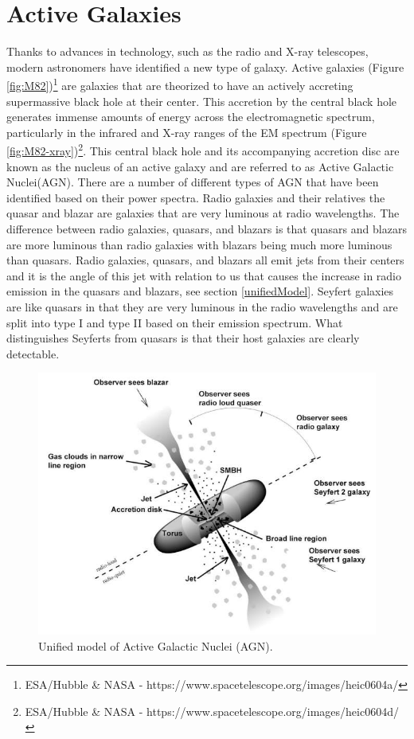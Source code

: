 \documentclass[12pt, oneside]{smuthesis}
\begin{document}
\section{\sc Active Galaxies} \label{activeGalaxies}

Thanks to advances in technology, such as the radio and X-ray telescopes, modern astronomers have identified a new type of galaxy. Active galaxies (Figure \ref{fig:M82})\footnote{ESA/Hubble \& NASA - https://www.spacetelescope.org/images/heic0604a/} are galaxies that are theorized to have an actively accreting supermassive black hole at their center. This accretion by the central black hole generates immense amounts of energy across the electromagnetic spectrum, particularly in the infrared and X-ray ranges of the EM spectrum (Figure \ref{fig:M82-xray})\footnote{ESA/Hubble \& NASA - https://www.spacetelescope.org/images/heic0604d/}. This central black hole and its accompanying accretion disc are known as the nucleus of an active galaxy and are referred to as Active Galactic Nuclei(AGN). There are a number of different types of AGN that have been identified based on their power spectra. Radio galaxies and their relatives the quasar and blazar are galaxies that are very luminous at radio wavelengths. The difference between radio galaxies, quasars, and blazars is that quasars and blazars are more luminous than radio galaxies with blazars being much more luminous than quasars. Radio galaxies, quasars, and blazars all emit jets from their centers and it is the angle of this jet with relation to us that causes the increase in radio emission in the quasars and blazars, see section \ref{unifiedModel}. Seyfert galaxies are like quasars in that they are very luminous in the radio wavelengths and are split into type I and type II based on their emission spectrum. What distinguishes Seyferts from quasars is that their host galaxies are clearly detectable.

\begin{figure}[H]
	\centering
	\includegraphics[width=0.6\linewidth]{UnifiedModel}
	\caption{Unified model of Active Galactic Nuclei (AGN).}
	\label{fig:unifiedModel}
\end{figure}
\end{document}
